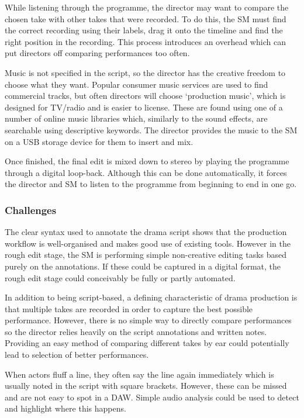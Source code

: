 While listening through the programme, the director may want to compare the chosen take with other takes that were
recorded. To do this, the SM must find the correct recording using their labels, drag it onto the timeline and find the
right position in the recording. This process introduces an overhead which can put directors off comparing performances
too often.

Music is not specified in the script, so the director has the creative freedom to choose what they want. Popular
consumer music services are used to find commercial tracks, but often directors will choose `production music', which
is designed for TV/radio and is easier to license. These are found using one of a number of online music libraries
which, similarly to the sound effects, are searchable using descriptive keywords. The director provides the music to
the SM on a USB storage device for them to insert and mix.

Once finished, the final edit is mixed down to stereo by playing the programme through a digital loop-back. Although
this can be done automatically, it forces the director and SM to listen to the programme from beginning to end in one
go.

\subsubsection{Challenges}
The clear syntax used to annotate the drama script shows that the production workflow is well-organised and makes good
use of existing tools. However in the rough edit stage, the SM is performing simple non-creative editing tasks based
purely on the annotations. If these could be captured in a digital format, the rough edit stage could conceivably be
fully or partly automated.

In addition to being script-based, a defining characteristic of drama production is that multiple takes are recorded in
order to capture the best possible performance. However, there is no simple way to directly compare performances so the
director relies heavily on the script annotations and written notes. Providing an easy method of comparing different
takes by ear could potentially lead to selection of better performances.

When actors fluff a line, they often say the line again immediately which is usually noted in the script with square
brackets. However, these can be missed and are not easy to spot in a DAW. Simple audio analysis could be used to detect
and highlight where this happens.

